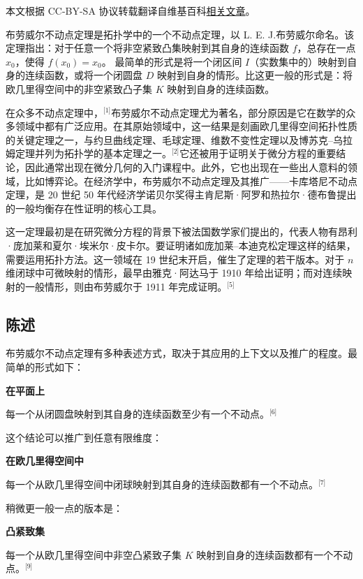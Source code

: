 
本文根据 CC-BY-SA 协议转载翻译自维基百科\href{https://en.wikipedia.org/wiki/Brouwer_fixed-point_theorem}{相关文章}。

布劳威尔不动点定理是拓扑学中的一个不动点定理，以 L. E. J.布劳威尔命名。该定理指出：对于任意一个将非空紧致凸集映射到其自身的连续函数 $f$，总存在一点 $x_0$，使得 $f(x_0) = x_0$。
最简单的形式是将一个闭区间 $I$（实数集中的）映射到自身的连续函数，或将一个闭圆盘 $D$ 映射到自身的情形。比这更一般的形式是：将欧几里得空间中的非空紧致凸子集 $K$ 映射到自身的连续函数。

在众多不动点定理中，\(^\text{[1]}\)布劳威尔不动点定理尤为著名，部分原因是它在数学的众多领域中都有广泛应用。在其原始领域中，这一结果是刻画欧几里得空间拓扑性质的关键定理之一，与约旦曲线定理、毛球定理、维数不变性定理以及博苏克–乌拉姆定理并列为拓扑学的基本定理之一。\(^\text{[2]}\)它还被用于证明关于微分方程的重要结论，因此通常出现在微分几何的入门课程中。此外，它也出现在一些出人意料的领域，比如博弈论。在经济学中，布劳威尔不动点定理及其推广——卡库塔尼不动点定理，是 20 世纪 50 年代经济学诺贝尔奖得主肯尼斯·阿罗和热拉尔·德布鲁提出的一般均衡存在性证明的核心工具。

这一定理最初是在研究微分方程的背景下被法国数学家们提出的，代表人物有昂利·庞加莱和夏尔·埃米尔·皮卡尔。要证明诸如庞加莱–本迪克松定理这样的结果，需要运用拓扑方法。这一领域在 19 世纪末开启，催生了定理的若干版本。对于 $n$ 维闭球中可微映射的情形，最早由雅克·阿达马于 1910 年给出证明；而对连续映射的一般情形，则由布劳威尔于 1911 年完成证明。\(^\text{[5]}\)
\subsection{陈述}
布劳威尔不动点定理有多种表述方式，取决于其应用的上下文以及推广的程度。最简单的形式如下：

\textbf{在平面上}

每一个从闭圆盘映射到其自身的连续函数至少有一个不动点。\(^\text{[6]}\)

这个结论可以推广到任意有限维度：

\textbf{在欧几里得空间中}

每一个从欧几里得空间中闭球映射到其自身的连续函数都有一个不动点。\(^\text{[7]}\)

稍微更一般一点的版本是：

\textbf{凸紧致集}

每一个从欧几里得空间中非空凸紧致子集 $K$ 映射到自身的连续函数都有一个不动点。\(^\text{[9]}\)

